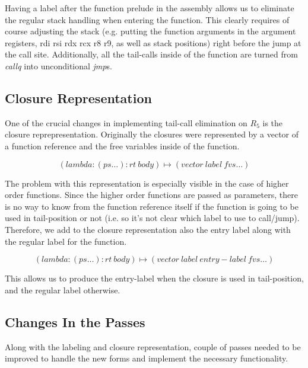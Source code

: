\documentclass[12pt]{article}
\begin{document}
Having a label after the function prelude in the assembly allows us to
eliminate the regular stack handling when entering the function. This
clearly requires of course adjusting the stack (e.g. putting the
function arguments in the argument registers, rdi rsi rdx rcx r8 r9,
as well as stack positions) right before the jump at the call
site. Additionally, all the tail-calls inside of the function are
turned from \emph{callq} into unconditional \emph{jmp}s.

\subsection{Closure Representation}

One of the crucial changes in implementing tail-call elimination on
$R_5$ is the closure reprepresentation. Originally the closures were
represented by a vector of a function reference and the free variables
inside of the function.

\begin{equation*}
(lambda: (ps \ldots) : rt\ body) \mapsto (vector\ label\ fvs \ldots)
\end{equation*}

The problem with this representation is especially visible in the case
of higher order functions. Since the higher order functions are passed
as parameters, there is no way to know from the function reference
itself if the function is going to be used in tail-position or not
(i.e. so it's not clear which label to use to call/jump). Therefore,
we add to the closure representation also the entry label along with
the regular label for the function.

\begin{equation*}
(lambda: (ps \ldots) : rt\ body) \mapsto (vector\ label\ entry-label\ fvs \ldots)
\end{equation*}

This allows us to produce the entry-label when the closure is used in
tail-position, and the regular label otherwise.

\subsection{Changes In the Passes}

Along with the labeling and closure representation, couple of passes
needed to be improved to handle the new forms and implement the
necessary functionality.
\end{document}
